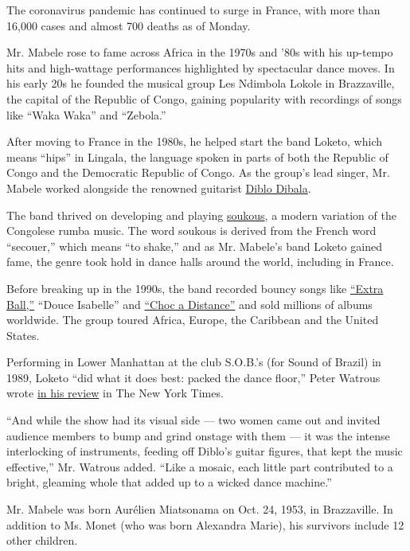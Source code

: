 The coronavirus pandemic has continued to surge in France, with more
than 16,000 cases and almost 700 deaths as of Monday.

Mr. Mabele rose to fame across Africa in the 1970s and '80s with his
up-tempo hits and high-wattage performances highlighted by spectacular
dance moves. In his early 20s he founded the musical group Les Ndimbola
Lokole in Brazzaville, the capital of the Republic of Congo, gaining
popularity with recordings of songs like ``Waka Waka'' and ``Zebola.''

After moving to France in the 1980s, he helped start the band Loketo,
which means ``hips'' in Lingala, the language spoken in parts of both
the Republic of Congo and the Democratic Republic of Congo. As the
group's lead singer, Mr. Mabele worked alongside the renowned guitarist
\href{http://africanmusic.org/artists/diblo.html}{Diblo Dibala}.

The band thrived on developing and playing
\href{https://www.last.fm/tag/soukous}{soukous}, a modern variation of
the Congolese rumba music. The word soukous is derived from the French
word ``secouer,'' which means ``to shake,'' and as Mr. Mabele's band
Loketo gained fame, the genre took hold in dance halls around the world,
including in France.

Before breaking up in the 1990s, the band recorded bouncy songs like
\href{https://www.youtube.com/watch?v=ug4lzZNUo1M}{``Extra Ball,''}
``Douce Isabelle'' and
\href{https://www.dailymotion.com/video/x1ju7ip}{``Choc a Distance''}
and sold millions of albums worldwide. The group toured Africa, Europe,
the Caribbean and the United States.

Performing in Lower Manhattan at the club S.O.B.'s (for Sound of Brazil)
in 1989, Loketo ``did what it does best: packed the dance floor,'' Peter
Watrous wrote
\href{https://www.nytimes3xbfgragh.onion/1989/10/06/arts/review-music-congo-s-beat-lifts-a-crowd-to-its-feet-and-the-floor.html}{in
his review} in The New York Times.

``And while the show had its visual side --- two women came out and
invited audience members to bump and grind onstage with them --- it was
the intense interlocking of instruments, feeding off Diblo's guitar
figures, that kept the music effective,'' Mr. Watrous added. ``Like a
mosaic, each little part contributed to a bright, gleaming whole that
added up to a wicked dance machine.''

Mr. Mabele was born Aurélien Miatsonama on Oct. 24, 1953, in
Brazzaville. In addition to Ms. Monet (who was born Alexandra Marie),
his survivors include 12 other children.

